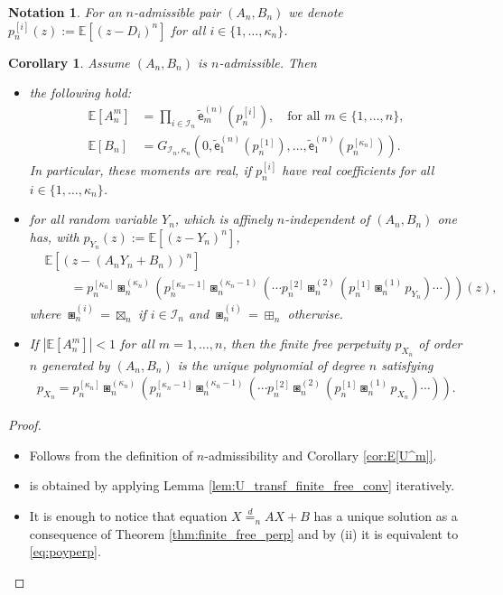 \documentclass[a4paper,11pt]{amsart}
\numberwithin{equation}{section}
\newtheorem{corollary}[theorem]{Corollary}
\newtheorem{notation}[theorem]{Notation}
\newcommand{\E}{\mathbb{E}}
\newcommand{\coef}[2]{\widetilde{\mathsf{e}}_{#1}^{(#2)}} %
\begin{document}
\begin{notation}
    For an $n$-admissible pair $(A_n, B_n)$ we denote \(p_n^{[i]}(z):=\E[(z-D_i)^n]\) for all $i\in\{1,\dots,\kappa_n\}$.
\end{notation}
\begin{corollary}\label{cor:n-admiss}
    Assume $(A_n, B_n)$ is $n$-admissible. Then 
    \begin{itemize}
\item[(i)] the following hold:
    \begin{align*}
        \E[A_n^m] &= \prod_{i\in\mathcal{I}_n} \coef{m}{n}(p_{n}^{[i]}), \quad \text{for all } m\in\{1,\dots,n\}, \\[1ex]
        \E[B_n] &= G_{\mathcal{I}_n,\kappa_n}(0, \coef{1}{n}(p_n^{[1]}),\dots,\coef{1}{n}(p_n^{[\kappa_n]})).
    \end{align*}
   In particular, these moments are real, if $p_n^{[i]}$ have real coefficients for all $i\in\{1,\dots,\kappa_n\}$.
\item[(ii)] for all random variable $Y_n$, which is affinely $n$-independent of $(A_n,B_n)$ one has, with $p_{Y_n}(z):= \E[(z-Y_n)^{n}]$,
\begin{align}\label{eq:AYB}
&\E[(z - (A_nY_n+B_n))^{n}] \nonumber \\
&\qquad = p_{n}^{[\kappa_n]}\boxast_n^{(\kappa_n)} \left( p_{n}^{[\kappa_n-1]}\boxast_n^{(\kappa_n-1)}\left(\cdots p_n^{[2]}\boxast_n^{(2)}\left( p_{n}^{[1]}\boxast_n^{(1)} p_{Y_n}\right)\cdots \right)\right) (z),
\end{align}
where $\boxast_n^{(i)}=\boxtimes_n$  if  \(i\in\mathcal{I}_n\) and $\boxast_n^{(i)}=\boxplus_n$ otherwise.
\item[(iii)] If $|\E[A_n^m]| <1$ for all $m=1,\ldots,n$, then the finite free perpetuity $p_{X_n}$ of order $n$ generated by $(A_n,B_n)$ is the unique polynomial of degree $n$ satisfying
    \begin{align}\label{eq:poyperp}
p_{X_n} =  p_{n}^{[\kappa_n]}\boxast_n^{(\kappa_n)} \left( p_{n}^{[\kappa_n-1]}\boxast_n^{(\kappa_n-1)}\left(\cdots p_n^{[2]}\boxast_n^{(2)}\left( p_{n}^{[1]}\boxast_n^{(1)} p_{X_n}\right)\cdots \right)\right).
    \end{align}
    \end{itemize} 
\end{corollary}
\begin{proof}
    \begin{itemize}
        \item[(i)] Follows from the definition of $n$-admissibility and Corollary \ref{cor:E[U^m]}.
        \item[(ii)] is obtained by applying Lemma \ref{lem:U_transf_finite_free_conv} iteratively.
        \item[(iii)] It is enough to notice that equation $X\overset{d}{=}_nAX+B$ has a unique solution as a consequence of Theorem \ref{thm:finite_free_perp} and by (ii) it is equivalent to \eqref{eq:poyperp}. 
    \end{itemize}
\end{proof}
\end{document}
